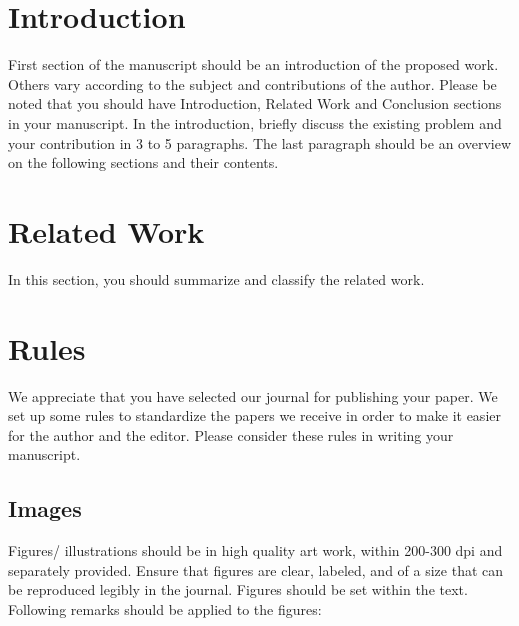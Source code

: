\documentclass[Print]{../Style/isecure-v24}
\begin{document}
\addtolength{\parskip}{2mm}


\section{Introduction} \label{sec:intro}

First section of the manuscript should be an introduction of the proposed work. Others vary according to the subject and contributions of the author. Please be noted that you should have Introduction, Related Work and Conclusion sections in your manuscript. In the introduction, briefly discuss the existing problem and your contribution in 3 to 5 paragraphs. The last paragraph should be an overview on the following sections and their contents. 

\lipsum[2-5]

\section{Related Work} \label{sec:related}
In this section, you should summarize and classify the related work. 

\lipsum[6-8]

\section{Rules} \label{sec:rules}
We appreciate that you have selected our journal for publishing your paper. We set up some rules to standardize the papers we receive in order to make it easier for the author and the editor. Please consider these rules in writing your manuscript.
\subsection{Images} \label{sec:images}

Figures/ illustrations should be in high quality art work, within 200-300 dpi and separately provided. Ensure that figures are clear, labeled, and of a size that can be reproduced legibly in the journal. Figures should be set within the text. Following remarks should be applied to the figures:
\end{document}

